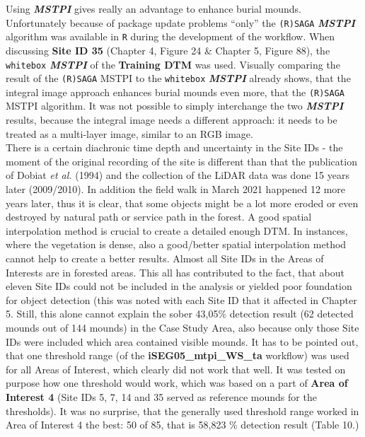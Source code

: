 \documentclass[
  12pt,
]{article}
\begin{document}
Using \textbf{\emph{MSTPI}} gives really an advantage to enhance burial mounds. Unfortunately because of package update problems ``only'' the \texttt{(R)SAGA} \textbf{\emph{MSTPI}} algorithm was available in \texttt{R} during the development of the workflow. When discussing \textbf{Site ID 35} (Chapter 4, Figure 24 \& Chapter 5, Figure 88), the \texttt{whitebox} \textbf{\emph{MSTPI}} of the \textbf{Training DTM} was used. Visually comparing the result of the \texttt{(R)SAGA} MSTPI to the \texttt{whitebox} \textbf{\emph{MSTPI}} already shows, that the integral image approach enhances burial mounds even more, that the \texttt{(R)SAGA} MSTPI algorithm. It was not possible to simply interchange the two \textbf{\emph{MSTPI}} results, because the integral image needs a different approach: it needs to be treated as a multi-layer image, similar to an RGB image.\\
There is a certain diachronic time depth and uncertainty in the Site IDs - the moment of the original recording of the site is different than that the publication of Dobiat \emph{et al.} (1994) and the collection of the LiDAR data was done 15 years later (2009/2010). In addition the field walk in March 2021 happened 12 more years later, thus it is clear, that some objects might be a lot more eroded or even destroyed by natural path or service path in the forest. A good spatial interpolation method is crucial to create a detailed enough DTM. In instances, where the vegetation is dense, also a good/better spatial interpolation method cannot help to create a better results. Almost all Site IDs in the Areas of Interests are in forested areas. This all has contributed to the fact, that about eleven Site IDs could not be included in the analysis or yielded poor foundation for object detection (this was noted with each Site ID that it affected in Chapter 5. Still, this alone cannot explain the sober 43,05\% detection result (62 detected mounds out of 144 mounds) in the Case Study Area, also because only those Site IDs were included which area contained visible mounds. It has to be pointed out, that one threshold range (of the \textbf{iSEG05\_mtpi\_WS\_ta} workflow) was used for all Areas of Interest, which clearly did not work that well. It was tested on purpose how one threshold would work, which was based on a part of \textbf{Area of Interest 4} (Site IDs 5, 7, 14 and 35 served as reference mounds for the thresholds). It was no surprise, that the generally used threshold range worked in Area of Interest 4 the best: 50 of 85, that is 58,823 \% detection result (Table 10.)
\end{document}
